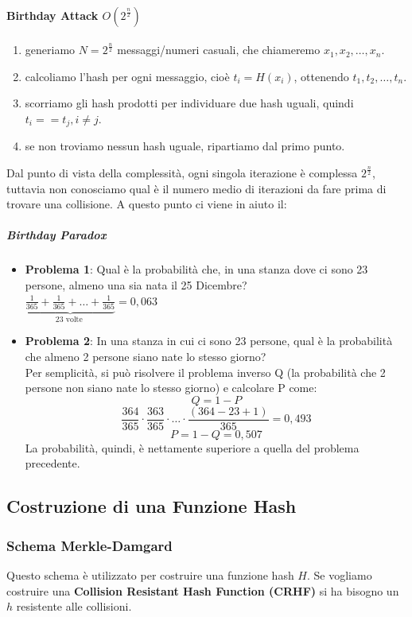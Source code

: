 \documentclass[a4paper,12pt]{article}
\begin{document}
\paragraph{Birthday Attack $O\left(2^{\frac{n}{2}}\right)$}
\begin{enumerate}
	\item generiamo $N = 2^{\frac{n}{2}}$ messaggi/numeri casuali, che chiameremo $x_1, x_2, \ldots , x_n$.
	\item calcoliamo l'hash per ogni messaggio, cioè $t_i = H(x_i)$, ottenendo $t_1, t_2, \ldots , t_n$.
	\item scorriamo gli hash prodotti per individuare due hash uguali, quindi $t_i == t_j, i \neq j$.
	\item se non troviamo nessun hash uguale, ripartiamo dal primo punto.
\end{enumerate}
Dal punto di vista della complessità, ogni singola iterazione è complessa $2^{\frac{n}{2}}$, tuttavia non conosciamo qual è il numero medio di iterazioni da fare prima di trovare una collisione.
A questo punto ci viene in aiuto il:

\subparagraph{Birthday Paradox}
\begin{itemize}
	\item \textbf{Problema 1}: Qual è la probabilità che, in una stanza dove ci sono 23 persone, almeno una sia nata il 25 Dicembre? \\
	$\underbrace{\frac{1}{365}+\frac{1}{365}+\ldots+\frac{1}{365}}_{23 \text { volte }}=0,063$
	\item \textbf{Problema 2}: In una stanza in cui ci sono 23 persone, qual è la probabilità che almeno 2 persone siano nate lo stesso giorno? \\
	Per semplicità, si può risolvere il problema inverso Q (la probabilità che 2 persone non siano nate lo stesso giorno) e calcolare P come:
	$$ Q = 1 - P $$ 
	$$\frac{364}{365} \cdot \frac{363}{365} \cdot \ldots \cdot \frac{(364-23+1)}{365}=0,493$$
	$$ P = 1 - Q = 0,507 $$
	La probabilità, quindi, è nettamente superiore a quella del problema precedente.
\end{itemize}

\subsection{Costruzione di una Funzione Hash}

\subsubsection{Schema Merkle-Damgard}
Questo schema è utilizzato per costruire una funzione hash $H$. Se vogliamo costruire una \textbf{Collision Resistant Hash Function (CRHF)} si ha bisogno un $h$ resistente alle collisioni.
\end{document}
